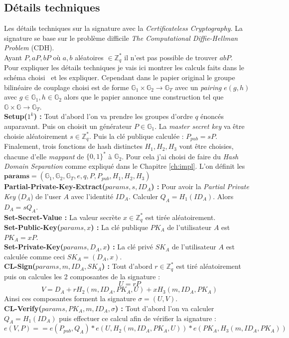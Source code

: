 \subsection{Détails techniques}
Les détails techniques sur la signature avec la \textit{Certificateless Cryptography}.
La signature se base sur le problème difficile \textit{The Computational Diffie-Hellman Problem} (CDH). \\Ayant $P, aP, bP$ où $a,b$ aléatoires $\in \mathbb{Z}_q^*$ il n'est pas possible de trouver $abP$.\\
Pour expliquer les détails techniques je vais ici montrer les calculs faits dans le schéma choisi~\cite{DBLP:conf/acns/ZhangWXF06} et les expliquer. Cependant dans le papier original le groupe bilinéaire de couplage choisi est de forme $\mathbb{G}_1 \times \mathbb{G}_2 \rightarrow \mathbb{G}_T$ avec un \textit{pairing} $e(g,h)$ avec $g \in \mathbb{G}_1, h \in \mathbb{G}_2$ alors que le papier annonce une construction tel que $\mathbb{G} \times \mathbb{G} \rightarrow \mathbb{G}_T$.\\
\textbf{Setup($1^k $) :} Tout d'abord l'on va prendre les groupes d'ordre $q$ énoncés auparavant. Puis on choisit un générateur $P \in \mathbb{G}_1$. La \textit{master secret key} va être choisie aléatoirement $s \in \mathbb{Z}_q^*$. Puis la clé publique calculée : $P_{pub} = sP$. Finalement, trois fonctions de hash distinctes $H_1, H_2, H_3$ vont être choisies, chacune d'elle \textit{mappant} de $\{0,1\}^*$ à $\mathbb{G}_2$. Pour cela j'ai choisi de faire du \textit{Hash Domain Separation} comme expliqué dans le Chapitre \ref{ch:impl}. L'on définit les $\mathbf{params} = (\mathbb{G}_1,\mathbb{G}_2,\mathbb{G}_T,e,q,P,P_{pub},H_1,H_2,H_3)$\\
\textbf{Partial-Private-Key-Extract($params, s, ID_A$) :} Pour avoir la \textit{Partial Private Key} ($D_A$) de l'user $A$ avec l'identité $ID_A$. Calculer $Q_A = H_1(ID_A)$. Alors $D_A = sQ_A$.\\
\textbf{Set-Secret-Value :} La valeur secrète $x \in \mathbb{Z}_q^*$ est tirée aléatoirement.\\
\textbf{Set-Public-Key($params, x$) :}  La clé publique $PK_A$ de l'utilisateur $A$ est $PK_A = xP$.\\
\textbf{Set-Private-Key($params, D_A, x$) :} La clé privé $SK_A$ de l'utilisateur $A$ est calculée comme ceci $SK_A = (D_A, x)$.\\
\textbf{CL-Sign($params, m, ID_A, SK_A$) :} Tout d'abord $r \in \mathbb{Z}_q^*$ est tiré aléatoirement puis on calcules les 2 composantes de la signature :
\[ U = rP\]
\[V = D_A + rH_2(m, ID_A, PK_A,U) + xH_3(m, ID_A, PK_A)\]
Ainsi ces composantes forment la signature $\sigma = (U,V )$.\\
\textbf{CL-Verify($params, PK_A,  m, ID_A, \sigma$) :} Tout d'abord l'on va calculer $Q_A = H_1(ID_A)$ puis effectuer ce calcul afin de vérifier la signature :
\[e(V,P) == e(P_{pub}, Q_A)*e(U, H_2(m, ID_A, PK_A,U))*e(PK_A, H_3(m, ID_A, PK_A)) \]
